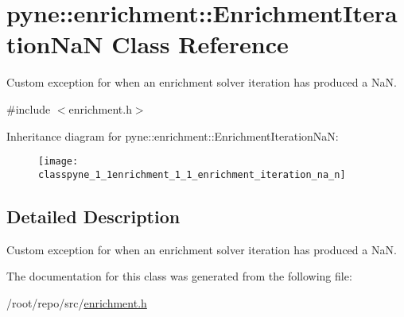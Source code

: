 \hypertarget{classpyne_1_1enrichment_1_1_enrichment_iteration_na_n}{}\section{pyne\+:\+:enrichment\+:\+:Enrichment\+Iteration\+NaN Class Reference}
\label{classpyne_1_1enrichment_1_1_enrichment_iteration_na_n}


Custom exception for when an enrichment solver iteration has produced a NaN.  




{\ttfamily \#include $<$enrichment.\+h$>$}

Inheritance diagram for pyne\+:\+:enrichment\+:\+:Enrichment\+Iteration\+NaN\+:\begin{figure}[H]
\begin{center}
\leavevmode
\texttt{[image: classpyne\_1\_1enrichment\_1\_1\_enrichment\_iteration\_na\_n]}
\end{center}
\end{figure}


\subsection{Detailed Description}
Custom exception for when an enrichment solver iteration has produced a NaN. 

The documentation for this class was generated from the following file\+:\begin{DoxyCompactItemize}
\item 
/root/repo/src/\hyperlink{enrichment_8h}{enrichment.\+h}\end{DoxyCompactItemize}
